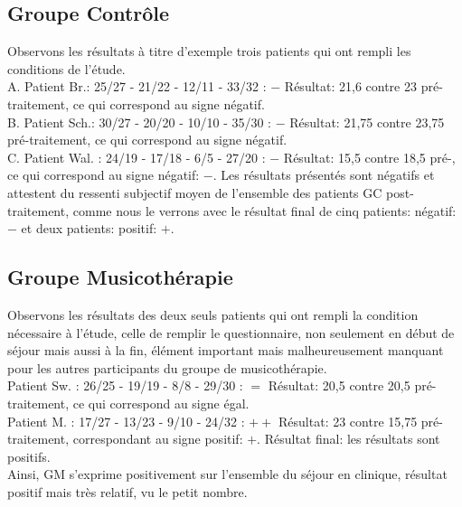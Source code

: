    \subsection{Groupe Contrôle}
   Observons les résultats à titre d'exemple trois patients qui ont rempli les conditions de 
   l'étude.
   \\
   	A. Patient Br.:  25/27 - 21/22 - 12/11 - 33/32 : $-$
   	Résultat: 21,6 contre 23 pré-traitement,  ce qui
   	correspond au signe négatif.
   	\\
   	B. Patient Sch.: 30/27 - 20/20 -  10/10 - 35/30 :  $-$
   	Résultat: 21,75 contre 23,75 pré-traitement, ce qui
   	correspond au signe négatif.
   	\\
   	C. Patient Wal. : 24/19 -  17/18 - 6/5 -
   	27/20 :   $-$
   	Résultat: 15,5 contre 18,5 pré-, ce qui correspond au signe négatif:  $-$.
   Les résultats présentés sont  négatifs 
   et attestent du ressenti subjectif moyen de l'ensemble des patients
   GC post-traitement,  comme nous le verrons avec  le résultat final de
   cinq patients:  négatif:  $-$ et deux patients: positif:  $+$.
   
\subsection {Groupe Musicothérapie}
Observons  les résultats des deux seuls patients  qui ont rempli  la condition nécessaire à 
l'étude, celle de remplir le questionnaire, non seulement en début de séjour mais aussi à la fin,
élément important mais malheureusement manquant pour les autres 
participants du groupe de musicothérapie.
 \\
 	Patient Sw. : 26/25 - 19/19 - 8/8 - 29/30 :   $=$
 	Résultat: 20,5 contre 20,5 pré-traitement, ce qui
 	correspond au signe égal.
 	\\
 	Patient M. : 17/27 - 13/23 -  9/10 - 24/32 :  $++$
 	Résultat: 23 contre 15,75 pré-traitement, correspondant au signe positif: $+$.
 Résultat final: les résultats sont positifs.
 	\\
 Ainsi,  GM s'exprime
 positivement
 sur l'ensemble du séjour en clinique, résultat positif mais très relatif, vu le petit nombre.

